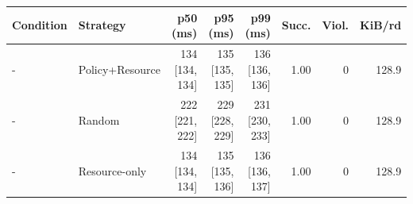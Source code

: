\begin{tabular}{llrrrrrr}
\toprule
Condition & Strategy & p50 (ms) & p95 (ms) & p99 (ms) & Succ. & Viol. & KiB/rd \\
\midrule
- & Policy+Resource & 134 [134, 134] & 135 [135, 135] & 136 [136, 136] & 1.00 & 0 & 128.9 \\
- & Random & 222 [221, 222] & 229 [228, 229] & 231 [230, 233] & 1.00 & 0 & 128.9 \\
- & Resource-only & 134 [134, 134] & 135 [135, 136] & 136 [136, 137] & 1.00 & 0 & 128.9 \\
\bottomrule
\end{tabular}
